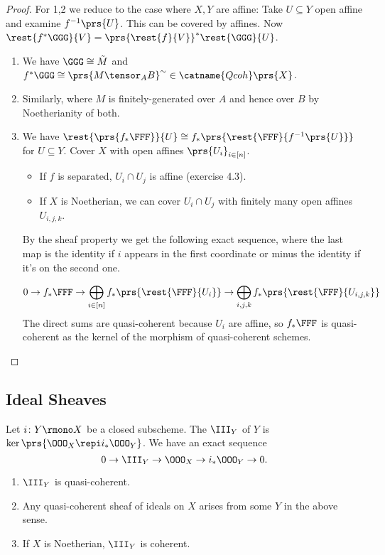 \documentclass[10pt,a4paper,twoside,openany,hidelinks]{book}
\begin{document}
\begin{proof}
For 1,2 we reduce to the case where $X,Y$ are affine:
Take $U \subseteq Y$ open affine and examine $f^{-1}\prs{U}$. This can be covered by affines. Now $\rest{f^* \GGG}{V} = \prs{\rest{f}{V}}^* \rest{\GGG}{U}$.

\begin{enumerate}
\item We have $\GGG \cong \tilde{M}$ and $f^* \GGG \cong \prs{M \tensor_A B}^{\sim} \in \catname{Qcoh}\prs{X}$.
\item Similarly, where $M$ is finitely-generated over $A$ and hence over $B$ by Noetherianity of both.
\item We have $\rest{\prs{f_* \FFF}}{U} \cong f_* \prs{\rest{\FFF}{f^{-1}\prs{U}}}$ for $U \subseteq Y$. Cover $X$ with open affines $\prs{U_i}_{i \in [n]}$.

\begin{itemize}
\item If $f$ is separated, $U_i \cap U_j$ is affine (exercise 4.3).

\item If $X$ is Noetherian, we can cover $U_i \cap U_j$ with finitely many open affines $U_{i,j,k}$.
\end{itemize}

By the sheaf property we get the following exact sequence, where the last map is the identity if $i$ appears in the first coordinate or minus the identity if it's on the second one.

\[0 \to f_* \FFF \to \bigoplus_{i \in [n]} f_* \prs{\rest{\FFF}{U_i}} \to \bigoplus_{i,j,k} f_* \prs{\rest{\FFF}{U_{i,j,k}}}\]
The direct sums are quasi-coherent because $U_i$ are affine, so $f_* \FFF$ is quasi-coherent as the kernel of the morphism of quasi-coherent schemes.
\end{enumerate}
\end{proof}

\subsection{Ideal Sheaves}

Let $i \colon Y \rmono X$ be a closed subscheme. The  $\III_Y$ of $Y$ is $\ker\prs{\OOO_X \repi i_* \OOO_Y}$. We have an exact sequence
\[0 \to \III_Y \to \OOO_X \to i_*\OOO_Y \to 0 \text{.}\]

\begin{proposition}
\begin{enumerate}
\item $\III_Y$ is quasi-coherent.
\item Any quasi-coherent sheaf of ideals on $X$ arises from some $Y$ in the above sense.
\item If $X$ is Noetherian, $\III_Y$ is coherent.
\end{enumerate}
\end{proposition}
\end{document}
